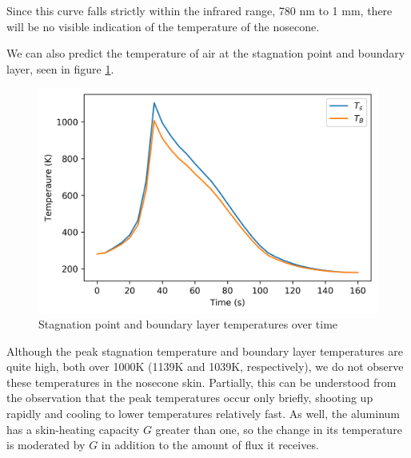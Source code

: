 \documentclass[twocolumn]{article}
\begin{document}
            Since this curve falls strictly within the infrared range, 780 nm to
            1 mm, there will be no visible indication of the temperature of the 
            nosecone.

            We can also predict the temperature of air at the stagnation point
            and boundary layer, seen in figure \ref{fig:boundstagtemps}.
            \begin{figure}[h]
                \includegraphics[width=\linewidth]{stagboundtemps.png}
                \caption{Stagnation point and boundary layer temperatures 
                over time}
                \label{fig:boundstagtemps}
            \end{figure}
            
            Although the peak stagnation temperature and boundary layer temperatures
            are quite high, both over 1000K (1139K and 1039K, respectively),
            we do not observe these temperatures in the nosecone skin. 
            Partially, this can be understood from the observation that the 
            peak temperatures occur only briefly, shooting up rapidly and 
            cooling to lower temperatures relatively fast. As well, the aluminum
            has a skin-heating capacity $G$ greater than one, so the change 
            in its temperature is moderated by $G$ in addition to the amount 
            of flux it receives.  
            
\end{document}
